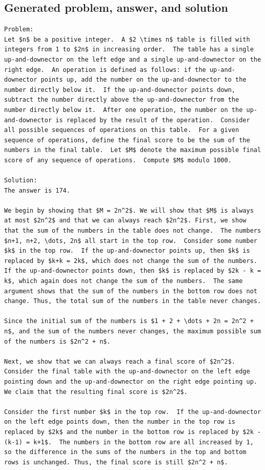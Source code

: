 \documentclass[11pt]{article}
\begin{document}
\subsection*{Generated problem, answer, and solution}
\begin{Verbatim}[breaklines=true,breakanywhere=true,fontsize=\small]
Problem:
Let $n$ be a positive integer.  A $2 \times n$ table is filled with integers from 1 to $2n$ in increasing order.  The table has a single up-and-downector on the left edge and a single up-and-downector on the right edge.  An operation is defined as follows: if the up-and-downector points up, add the number on the up-and-downector to the number directly below it.  If the up-and-downector points down, subtract the number directly above the up-and-downector from the number directly below it.  After one operation, the number on the up-and-downector is replaced by the result of the operation.  Consider all possible sequences of operations on this table.  For a given sequence of operations, define the final score to be the sum of the numbers in the final table.  Let $M$ denote the maximum possible final score of any sequence of operations.  Compute $M$ modulo 1000.

Solution:
The answer is 174.

We begin by showing that $M = 2n^2$. We will show that $M$ is always at most $2n^2$ and that we can always reach $2n^2$. First, we show that the sum of the numbers in the table does not change.  The numbers $n+1, n+2, \dots, 2n$ all start in the top row.  Consider some number $k$ in the top row.  If the up-and-downector points up, then $k$ is replaced by $k+k = 2k$, which does not change the sum of the numbers.  If the up-and-downector points down, then $k$ is replaced by $2k - k = k$, which again does not change the sum of the numbers.  The same argument shows that the sum of the numbers in the bottom row does not change. Thus, the total sum of the numbers in the table never changes.

Since the initial sum of the numbers is $1 + 2 + \dots + 2n = 2n^2 + n$, and the sum of the numbers never changes, the maximum possible sum of the numbers is $2n^2 + n$.

Next, we show that we can always reach a final score of $2n^2$. Consider the final table with the up-and-downector on the left edge pointing down and the up-and-downector on the right edge pointing up.  We claim that the resulting final score is $2n^2$.

Consider the first number $k$ in the top row.  If the up-and-downector on the left edge points down, then the number in the top row is replaced by $2k$ and the number in the bottom row is replaced by $2k - (k-1) = k+1$.  The numbers in the bottom row are all increased by 1, so the difference in the sums of the numbers in the top and bottom rows is unchanged. Thus, the final score is still $2n^2 + n$.


\end{Verbatim}
\end{document}
